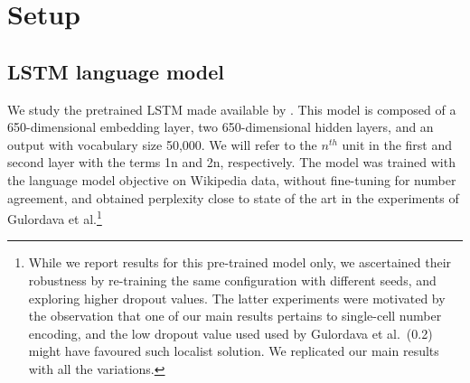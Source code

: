 
\section{Setup}


\subsection{LSTM language model}\label{ssec:lstm_lm}
We study the pretrained LSTM made available by
.  This model is composed of a
650-dimensional embedding layer, two 650-dimensional hidden layers,
and an output with vocabulary size 50,000. We will refer to the
$n^{th}$ unit in the first and second layer with the terms \unit{1}{n}
and \unit{2}{n}, respectively. The model was trained with the language
model objective on Wikipedia data, without fine-tuning for number
agreement, and obtained perplexity close to state of the art in the experiments of Gulordava et al.\footnote{While we report results for this pre-trained model
  only, we ascertained their robustness by re-training the same
  configuration with different seeds, and exploring higher dropout
  values. The latter experiments were motivated by the observation
  that one of our main results pertains to single-cell number
  encoding, and the low dropout value used used by Gulordava et
  al.~(0.2) might have favoured such localist solution. We replicated
  our main results with all the variations.} 



